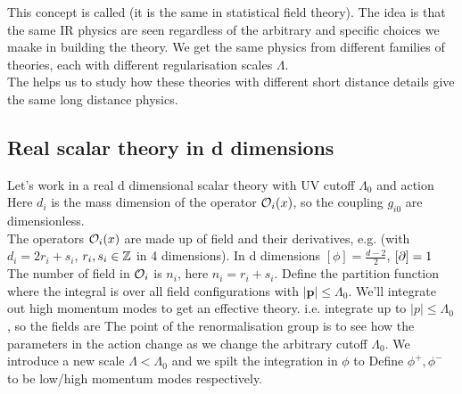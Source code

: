 \documentclass{article}
\begin{document}
This concept is called  (it is the same in statistical field theory). The idea is that the same IR physics are seen regardless of the arbitrary and specific choices we maake in building the theory. We get the same physics from different families of theories, each with different regularisation scales $\Lambda$. \\

The  helps us to study how these theories with different short distance details give the same long distance physics. 



\subsection{Real scalar theory in d dimensions}
Let's work in a real d dimensional scalar theory with UV cutoff $\Lambda_0$ and action 
Here $d_i$ is the mass dimension of the operator $\mathcal{O}_i(x)$, so the coupling $g_{i0}$ are dimensionless. \\
The operators $\mathcal{O}_i(x)$ are made up of field and their derivatives, e.g. 
(with $d_i = 2r_i + s_i$, $r_i,s_i \in \mathbb{Z}$ in 4 dimensions). In d dimensions $[\phi] = \frac{d-2}{2}$, $[\partial] = 1$ 
The number of field in $\mathcal{O}_i$ is $n_i$, here $n_i = r_i + s_i$. Define the partition function 
where the integral is over all field configurations with $|\bm{p}| \leq \Lambda_0$. We'll integrate out high momentum modes to get an effective theory. i.e. integrate up to $|p|\leq \Lambda_0$, so the fields are 
The point of the renormalisation group is to see how the parameters in the action change as we change the arbitrary cutoff $\Lambda_0$. We introduce a new scale $\Lambda < \Lambda_0$ and we spilt the integration in $\phi$ to 
Define $\phi^+, \phi^-$ to be low/high momentum modes respectively. 
\end{document}
